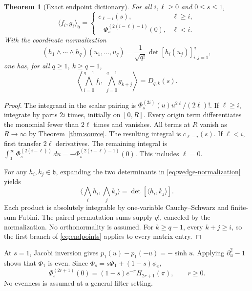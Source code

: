 \documentclass[11pt,letterpaper]{article}
\numberwithin{equation}{section}
\newtheorem{theorem}{Theorem}[section]
\theoremstyle{remark}
\newcommand{\dd}{\,d}
\newcommand{\ip}[2]{\langle #1,#2\rangle}
\newcommand{\hs}{\mathfrak h}
\begin{document}
\begin{theorem}[Exact endpoint dictionary]\label{thm:pairing}
For all \(i,\ell\ge0\) and \(0\le s\le1\),
\begin{equation}
 \ip{f_i}{g_\ell}_{\hs}=
 \begin{cases}
 c_{\ell-i}(s),&\ell\ge i,\\
 -\Phi_s^{(2(i-\ell)-1)}(0),&\ell<i.
 \end{cases} \label{eq:endpoints}
\end{equation}
With the coordinate normalization
\begin{equation}
 (h_1\wedge\cdots\wedge h_q)(u_1,\ldots,u_q)
 =\frac1{\sqrt{q!}}\det[h_i(u_j)]_{i,j=1}^q,
 \label{eq:wedge-normalization}
\end{equation}
one has, for all \(q\ge1,\ k\ge q-1\),
\begin{equation}
 \left\langle\bigwedge_{i=0}^{q-1}f_i,\
                   \bigwedge_{j=0}^{q-1}g_{k+j}\right\rangle
 =D_{q,k}(s).
 \label{eq:wedge-pairing}
\end{equation}
\end{theorem}
\begin{proof}
The integrand in the scalar pairing is
\(\Phi_s^{(2i)}(u)u^{2\ell}/(2\ell)!\).
If \(\ell\ge i\), integrate by parts \(2i\) times, initially on
\([0,R]\). Every origin term differentiates the monomial fewer than
\(2\ell\) times and vanishes. All terms at \(R\) vanish as
\(R\to\infty\) by Theorem~\ref{thm:source}. The resulting integral
is \(c_{\ell-i}(s)\). If \(\ell<i\), first transfer \(2\ell\)
derivatives. The remaining integral is
\(\int_0^\infty\Phi_s^{(2(i-\ell))}\dd u
=-\Phi_s^{(2(i-\ell)-1)}(0)\).
This includes \(\ell=0\).

For any \(h_i,k_j\in\hs\), expanding the two determinants in
\eqref{eq:wedge-normalization} yields
\[
 \ip{\bigwedge_i h_i}{\bigwedge_j k_j}
 =\det[\ip{h_i}{k_j}].
\]
Each product is absolutely integrable by one-variable
Cauchy--Schwarz and finite-sum Fubini. The paired permutation sums
supply \(q!\), canceled by the normalization. No orthonormality is
assumed. For \(k\ge q-1\), every \(k+j\ge i\), so the first
branch of \eqref{eq:endpoints} applies to every matrix entry.
\end{proof}

At \(s=1\), Jacobi inversion gives
\(p_1(u)-p_1(-u)=-\sinh u\). Applying
\(\partial_u^2-1\) shows that \(\Phi_1\) is even.
Since \(\Phi_s=s\Phi_1+(1-s)\phi_\pi\),
\begin{equation}
 \Phi_s^{(2r+1)}(0)=(1-s)e^{-\pi}H_{2r+1}(\pi),\qquad r\ge0.
 \label{eq:odd-endpoint}
\end{equation}
No evenness is assumed at a general filter setting.
\end{document}
